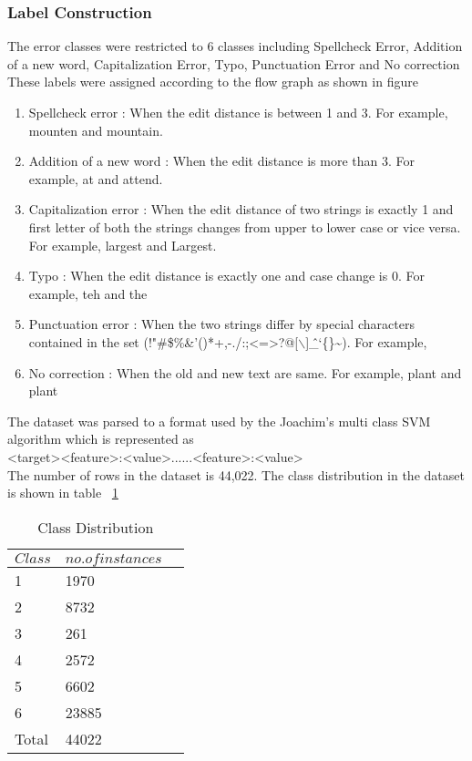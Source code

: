 \documentclass[letterpaper]{article}
\begin{document}
\subsubsection{Label Construction}
The error classes were restricted to 6 classes including Spellcheck Error, Addition of a new word, Capitalization Error, Typo, Punctuation Error and No correction
These labels were assigned according to the flow graph as shown in figure
\begin{enumerate}
\item Spellcheck error : When the edit distance is between 1 and 3. For example, mounten and mountain.
\item Addition of a new word : When the edit distance is more than 3. For example, at and attend.
\item Capitalization error : When the edit distance of two strings is exactly 1 and first letter of both the strings changes from upper to lower case or vice versa. For example, largest and Largest.
\item Typo : When the edit distance is exactly one and case change is 0. For example, teh and the
\item Punctuation error : When the two strings differ by special characters contained in the set (!"\#\$\%\&'()*+,-./:;\textless=\textgreater?@[$\backslash$]\^\_`\{\textbar\}\textasciitilde). For example, 
\item No correction :  When the old and new text are same. For example, plant and plant
\end{enumerate}

The dataset was parsed to a format used by the Joachim's multi class SVM algorithm which is represented as\\
\textless target\textgreater\space\textless feature\textgreater:\textless value\textgreater ......\textless feature\textgreater:\textless value\textgreater\\
The number of rows in the dataset is 44,022. The class distribution in the dataset is shown in table ~\ref{table: classes}
\begin{table}[htdp]
\begin{center}
\begin{tabular}{l | l r |}
$ Class $ & $ no. of instances $ \\
\hline
1 & 1970 \\
\hline 
2 & 8732 \\
\hline
3 & 261 \\
\hline
4 & 2572 \\
\hline
5 & 6602 \\
\hline
6 & 23885 \\
\hline
Total & 44022 \\
\end{tabular}
\end{center}
\caption{Class Distribution}
\label{table: classes}
\end{table}
\end{document}
